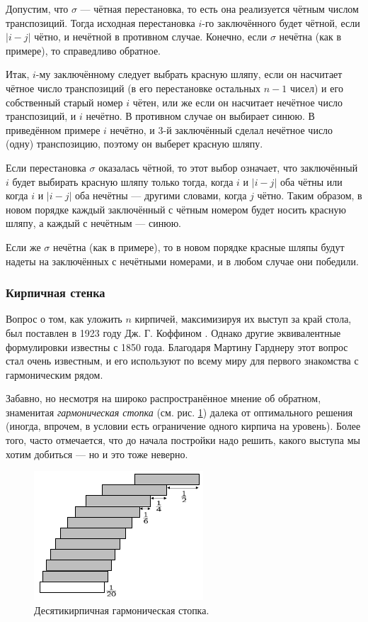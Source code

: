 Допустим, что $\sigma$ --- чётная перестановка, то есть она реализуется чётным числом транспозиций.
Тогда исходная перестановка $i$-го заключённого будет чётной, если $|i - j|$ чётно, и нечётной в противном случае.
Конечно, если $\sigma$ нечётна (как в примере), то справедливо обратное.

Итак, $i$-му заключённому следует выбрать красную шляпу, если он насчитает чётное число транспозиций (в его перестановке остальных $n - 1$ чисел) и его собственный старый номер $i$ чётен, или же если он насчитает нечётное число транспозиций, и $i$ нечётно.
В противном случае он выбирает синюю.
В приведённом примере $i$ нечётно, и $3$-й заключённый сделал нечётное число (одну) транспозицию, поэтому он выберет красную шляпу.

Если перестановка $\sigma$ оказалась чётной, то этот выбор означает, что заключённый $i$ будет выбирать красную шляпу только тогда, когда $i$ и $|i - j|$ оба чётны или когда $i$ и $|i - j|$ оба нечётны --- другими словами, когда $j$ чётно.
Таким образом, в новом порядке каждый заключённый с чётным номером будет носить красную шляпу, а каждый с нечётным --- синюю.

Если же $\sigma$ нечётна (как в примере), то в новом порядке красные шляпы будут надеты на заключённых с нечётными номерами, и в любом случае они победили.

\subsubsection*{Кирпичная стенка}

Вопрос о том, как уложить $n$ кирпичей, максимизируя их выступ за край стола, был поставлен в 1923 году Дж. Г. Коффином \cite{12}.
Однако другие эквивалентные формулировки известны с 1850 года.
Благодаря Мартину Гарднеру этот вопрос стал очень известным, и его используют по всему миру для первого знакомства с гармоническим рядом.

Забавно, но несмотря на широко распространённое мнение об обратном, знаменитая \emph{гармоническая стопка} (см. рис. \ref{pic:kirpich1}) далека от оптимального решения (иногда, впрочем, в условии есть ограничение одного кирпича на уровень).
Более того, часто отмечается, что до начала постройки надо решить, какого выступа мы хотим добиться --- но и это тоже неверно.

\begin{figure}[ht!]
\centering
\includegraphics[scale=1]{pics/kirpich1}
\caption{Десятикирпичная гармоническая стопка.}
\label{pic:kirpich1}
\end{figure}

